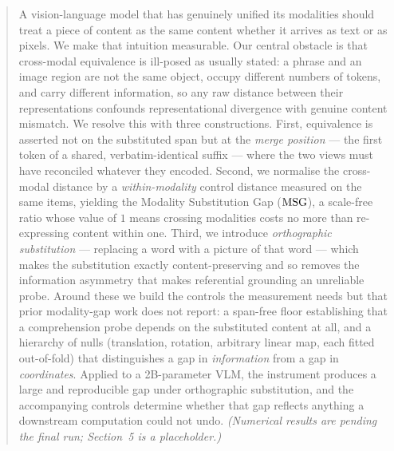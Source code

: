 \begin{abstract}
A vision-language model that has genuinely unified its modalities should treat a
piece of content as the same content whether it arrives as text or as pixels.
We make that intuition measurable. Our central obstacle is that cross-modal
equivalence is ill-posed as usually stated: a phrase and an image region are not
the same object, occupy different numbers of tokens, and carry different
information, so any raw distance between their representations confounds
representational divergence with genuine content mismatch. We resolve this with
three constructions. First, equivalence is asserted not on the substituted span
but at the \emph{merge position} --- the first token of a shared, verbatim-identical
suffix --- where the two views must have reconciled whatever they encoded.
Second, we normalise the cross-modal distance by a \emph{within-modality} control
distance measured on the same items, yielding the Modality Substitution Gap
($\msg$), a scale-free ratio whose value of $1$ means crossing modalities costs
no more than re-expressing content within one. Third, we introduce
\emph{orthographic substitution} --- replacing a word with a picture of that word ---
which makes the substitution exactly content-preserving and so removes the
information asymmetry that makes referential grounding an unreliable probe.
Around these we build the controls the measurement needs but that prior modality-gap
work does not report: a span-free floor establishing that a comprehension probe
depends on the substituted content at all, and a hierarchy of nulls
(translation, rotation, arbitrary linear map, each fitted out-of-fold) that
distinguishes a gap in \emph{information} from a gap in \emph{coordinates}. Applied to a
2B-parameter VLM, the instrument produces a large and reproducible gap under
orthographic substitution, and the accompanying controls determine whether that
gap reflects anything a downstream computation could not undo.
\emph{(Numerical results are pending the final run; Section~5 is a placeholder.)}
\end{abstract}
